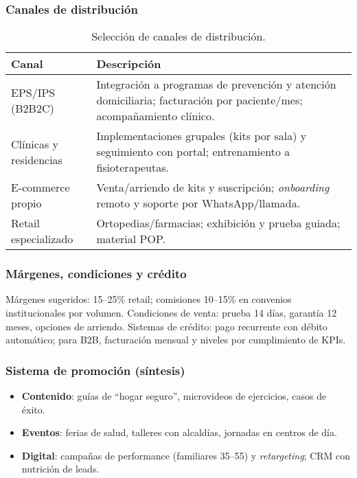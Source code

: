 \subsubsection{Canales de distribución}
\begin{table}[H]
\centering
\renewcommand{\arraystretch}{1.12}
\begin{tabular}{p{4.2cm} p{10.2cm}}
\toprule
\textbf{Canal} & \textbf{Descripción}\\
\midrule
EPS/IPS (B2B2C) & Integración a programas de prevención y atención domiciliaria; facturación por paciente/mes; acompañamiento clínico.\\
Clínicas y residencias & Implementaciones grupales (kits por sala) y seguimiento con portal; entrenamiento a fisioterapeutas.\\
E-commerce propio & Venta/arriendo de kits y suscripción; \emph{onboarding} remoto y soporte por WhatsApp/llamada.\\
Retail especializado & Ortopedias/farmacias; exhibición y prueba guiada; material POP.\\
\bottomrule
\end{tabular}
\caption{Selección de canales de distribución.}
\end{table}

\subsubsection{Márgenes, condiciones y crédito}
Márgenes sugeridos: 15--25\% retail; comisiones 10--15\% en convenios institucionales por volumen. Condiciones de venta: prueba 14 días, garantía 12 meses, opciones de arriendo. Sistemas de crédito: pago recurrente con débito automático; para B2B, facturación mensual y niveles por cumplimiento de KPIs.

\subsubsection{Sistema de promoción (síntesis)}
\begin{itemize}
    \item \textbf{Contenido}: guías de “hogar seguro”, microvideos de ejercicios, casos de éxito.
    \item \textbf{Eventos}: ferias de salud, talleres con alcaldías, jornadas en centros de día.
    \item \textbf{Digital}: campañas de performance (familiares 35--55) y \emph{retargeting}; CRM con nutrición de leads.
\end{itemize}

